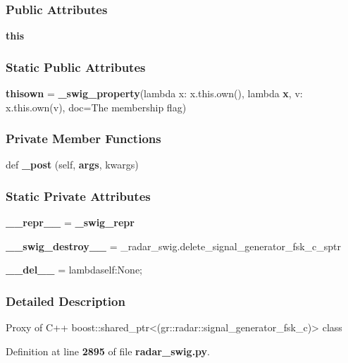 \subsubsection*{Public Attributes}
\begin{DoxyCompactItemize}
\item 
{\bf this}
\end{DoxyCompactItemize}
\subsubsection*{Static Public Attributes}
\begin{DoxyCompactItemize}
\item 
{\bf thisown} = {\bf \+\_\+swig\+\_\+property}(lambda x\+: x.\+this.\+own(), lambda {\bf x}, v\+: x.\+this.\+own(v), doc=\textquotesingle{}The membership flag\textquotesingle{})
\end{DoxyCompactItemize}
\subsubsection*{Private Member Functions}
\begin{DoxyCompactItemize}
\item 
def {\bf \+\_\+post} (self, {\bf args}, kwargs)
\end{DoxyCompactItemize}
\subsubsection*{Static Private Attributes}
\begin{DoxyCompactItemize}
\item 
{\bf \+\_\+\+\_\+repr\+\_\+\+\_\+} = {\bf \+\_\+swig\+\_\+repr}
\item 
{\bf \+\_\+\+\_\+swig\+\_\+destroy\+\_\+\+\_\+} = \+\_\+radar\+\_\+swig.\+delete\+\_\+signal\+\_\+generator\+\_\+fsk\+\_\+c\+\_\+sptr
\item 
{\bf \+\_\+\+\_\+del\+\_\+\+\_\+} = lambdaself\+:\+None;
\end{DoxyCompactItemize}


\subsubsection{Detailed Description}
\begin{DoxyVerb}Proxy of C++ boost::shared_ptr<(gr::radar::signal_generator_fsk_c)> class\end{DoxyVerb}
 

Definition at line {\bf 2895} of file {\bf radar\+\_\+swig.\+py}.



